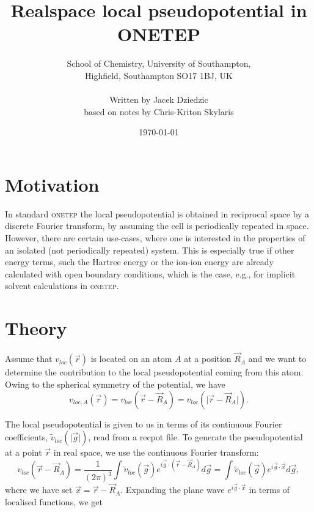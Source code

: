 \documentclass[a4paper,oneside,11pt]{article}
\newcommand{\onetep}{\textsc{onetep}}
\newcommand{\vlocr}{v_{loc}\left(\vec{r}\right)}
\newcommand{\vlocAr}{v_{loc,A}\left(\vec{r}\right)}
\newcommand{\vlocg}{\tilde{v}_{loc}\left(\vec{g}\right)}
\newcommand{\vlocabsg}{\tilde{v}_{loc}\left(\vert\vec{g}\vert\right)}
\begin{document}
\title{Realspace local pseudopotential in ONETEP}
\author{School of Chemistry, University of Southampton, \\ Highfield, Southampton SO17 1BJ, UK \\ \\ Written by Jacek Dziedzic \\ based on notes by Chris-Kriton Skylaris}
\date{\today}

\maketitle

\section{Motivation}
In standard \onetep{} the local pseudopotential is obtained in reciprocal space by a discrete Fourier transform, by assuming the cell is periodically repeated in space. However, there are certain use-cases, where one is interested in the properties of an isolated (not periodically repeated) system. This is especially true if other energy terms, such the Hartree energy or the ion-ion energy are already calculated with open boundary conditions, which is the case, e.g., for implicit solvent calculations in \onetep{}.

\section{Theory}
Assume that $\vlocr$ is located on an atom $A$ at a position $\vec{R}_A$ and we want to determine the contribution to the local pseudopotential coming from this atom. Owing to the spherical symmetry of the potential, we have
\begin{equation}
\vlocAr = v_{loc}\left(\vec{r}-\vec{R}_A\right) = v_{loc}\left(\vert\vec{r}-\vec{R}_A\vert\right). 
\end{equation}

The local pseudopotential is given to us in terms of its continuous Fourier coefficients, $\vlocabsg$, read from a recpot file. To generate the pseudopotential at a point $\vec{r}$ in real space, we use the continuous Fourier transform:
\begin{equation}
v_{loc}\left(\vec{r}-\vec{R}_A\right) = \frac{1}{{\left(2\pi\right)}^{3}}\int \vlocg e^{i\vec{g}\cdot \left(\vec{r}-\vec{R}_A\right)}d\vec{g}=\int\vlocg e^{i\vec{g}\cdot \vec{x}}d\vec{g}, 
\end{equation}
where we have set $\vec{x}=\vec{r}-\vec{R}_A$. Expanding the plane wave $e^{i\vec{g}\cdot\vec{x}}$ in terms of localised functions, we get
\end{document}
